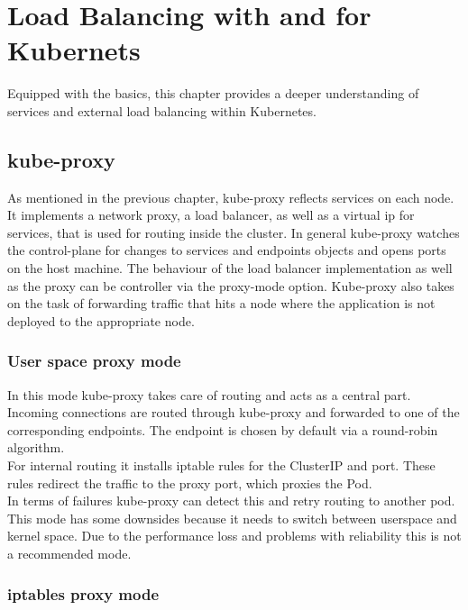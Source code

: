 \chapter{Load Balancing with and for Kubernets}

Equipped with the basics, this chapter provides a deeper understanding of services and external load balancing within Kubernetes.

\section{kube-proxy}\label{sec:kubeproxy}

As mentioned in the previous chapter, kube-proxy reflects services on each node.
It implements a network proxy, a load balancer, as well as a virtual ip for services, that is used for routing inside the cluster.
In general kube-proxy watches the control-plane for changes to services and endpoints objects and opens ports on the host machine.
The behaviour of the load balancer implementation as well as the proxy can be controller via the proxy-mode option.
Kube-proxy also takes on the task of forwarding traffic that hits a node where the application is not deployed to the appropriate node.~\cite{KUBERNETES-SERVICE}

\subsection{User space proxy mode}

In this mode kube-proxy takes care of routing and acts as a central part.
\\
Incoming connections are routed through kube-proxy and forwarded to one of the corresponding endpoints.
The endpoint is chosen by default via a round-robin algorithm.
\\
For internal routing it installs iptable rules for the ClusterIP and port.
These rules redirect the traffic to the proxy port, which proxies the Pod.
\\
In terms of failures kube-proxy can detect this and retry routing to another pod.
\\
This mode has some downsides because it needs to switch between userspace and kernel space.
Due to the performance loss and problems with reliability this is not a recommended mode.~\cite{KUBERNETES-SERVICE}

\subsection{iptables proxy mode}

